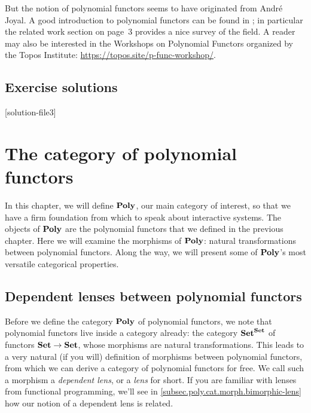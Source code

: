 \documentclass[Book-Poly]{subfiles}
\begin{document}
But the notion of polynomial functors seems to have originated from Andr\'{e} Joyal. A good introduction to polynomial functors can be found in \cite{kock2012polynomial}; in particular the related work section on page~3 provides a nice survey of the field. A reader may also be interested in the Workshops on Polynomial Functors organized by the Topos Institute: \url{https://topos.site/p-func-workshop/}.

\section{Exercise solutions}
{\footnotesize
    }

[solution-file3]

\chapter{The category of polynomial functors} \label{ch.poly.cat}


In this chapter, we will define $\mathbf{Poly}$, our main category of interest, so that we have a firm foundation from which to speak about interactive systems.
The objects of $\mathbf{Poly}$ are the polynomial functors that we defined in the previous chapter.
Here we will examine the morphisms of $\mathbf{Poly}$: natural transformations between polynomial functors.
Along the way, we will present some of $\mathbf{Poly}$'s most versatile categorical properties.

\section{Dependent lenses between polynomial functors}
\label{sec.poly.cat.morph}

Before we define the category $\mathbf{Poly}$ of polynomial functors, we note that polynomial functors live inside a category already: the category $\mathbf{Set}^{\mathbf{Set}}$ of functors $\mathbf{Set}\to\mathbf{Set}$, whose morphisms are natural transformations.
This leads to a very natural (if you will) definition of morphisms between polynomial functors, from which we can derive a category of polynomial functors for free.
We call such a morphism a \emph{dependent lens}, or a \emph{lens} for short.
If you are familiar with lenses from functional programming, we'll see in \cref{subsec.poly.cat.morph.bimorphic-lens} how our notion of a dependent lens is related.
\end{document}
